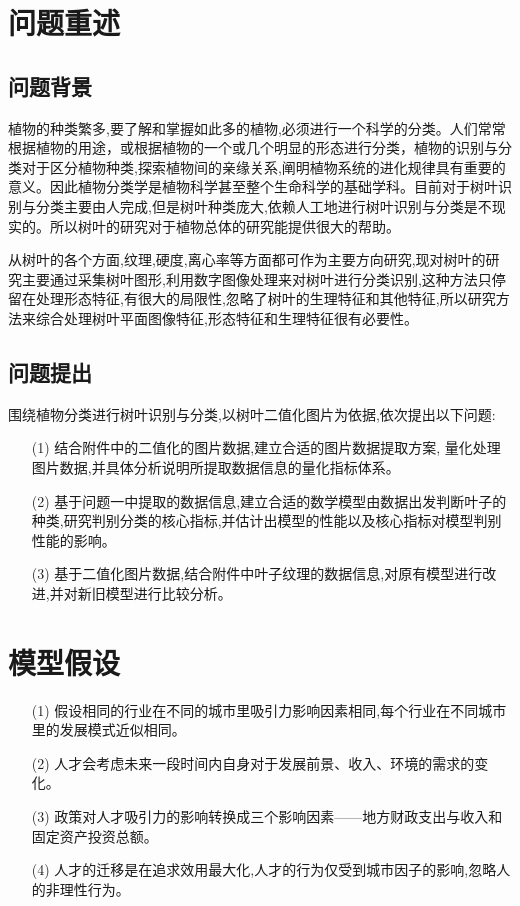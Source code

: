 \documentclass{whutmod}
\begin{document}
	\tableofcontents
	\newpage	%
	
	\section{问题重述}	
	\subsection{问题背景}
    植物的种类繁多,要了解和掌握如此多的植物,必须进行一个科学的分类。人们常常根据植物的用途，或根据植物的一个或几个明显的形态进行分类，植物的识别与分类对于区分植物种类,探索植物间的亲缘关系,阐明植物系统的进化规律具有重要的意义。因此植物分类学是植物科学甚至整个生命科学的基础学科。目前对于树叶识别与分类主要由人完成,但是树叶种类庞大,依赖人工地进行树叶识别与分类是不现实的。所以树叶的研究对于植物总体的研究能提供很大的帮助。
    
    从树叶的各个方面,纹理,硬度,离心率等方面都可作为主要方向研究,现对树叶的研究主要通过采集树叶图形,利用数字图像处理来对树叶进行分类识别,这种方法只停留在处理形态特征,有很大的局限性,忽略了树叶的生理特征和其他特征,所以研究方法来综合处理树叶平面图像特征,形态特征和生理特征很有必要性。
    
    

	\subsection{问题提出}
    围绕植物分类进行树叶识别与分类,以树叶二值化图片为依据,依次提出以下问题:
		 
	\begin{itemize}
	\item [(1)] 结合附件中的二值化的图片数据,建立合适的图片数据提取方案, 量化处理图片数据,并具体分析说明所提取数据信息的量化指标体系。
	\item [(2)] 基于问题一中提取的数据信息,建立合适的数学模型由数据出发判断叶子的种类,研究判别分类的核心指标,并估计出模型的性能以及核心指标对模型判别性能的影响。
	\item [(3)] 基于二值化图片数据,结合附件中叶子纹理的数据信息,对原有模型进行改进,并对新旧模型进行比较分析。
	\end{itemize}
	
	\section{模型假设}
	\begin{itemize}
		\item [(1)] 假设相同的行业在不同的城市里吸引力影响因素相同,每个行业在不同城市里的发展模式近似相同。
		\item [(2)] 人才会考虑未来一段时间内自身对于发展前景、收入、环境的需求的变化。
		\item [(3)] 政策对人才吸引力的影响转换成三个影响因素——地方财政支出与收入和固定资产投资总额。
		\item [(4)] 人才的迁移是在追求效用最大化,人才的行为仅受到城市因子的影响,忽略人的非理性行为。
	\end{itemize}
	
\end{document}
